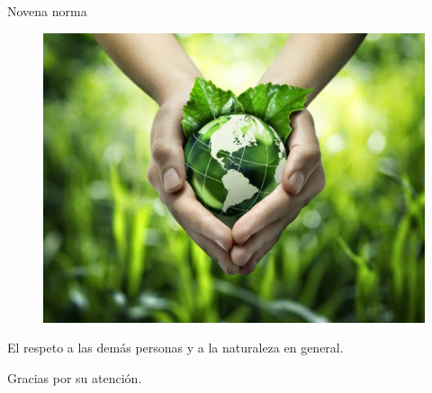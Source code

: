 \documentclass{beamer}
\begin{document}
 \begin{frame}{Novena norma}
 \begin{figure}
 \includegraphics[scale=.35]{Images/NORMA9.jpg} 
 \end{figure}
 El respeto a las demás personas y a la naturaleza en general. 
 \end{frame}
 \begin{frame}
\begin{center}
 Gracias por su atención.
\end{center}
 \end{frame}
\end{document}
